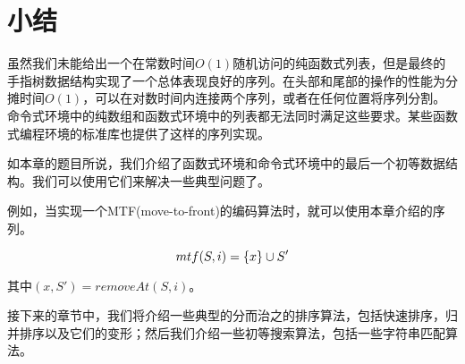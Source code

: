 \documentclass[UTF8]{article}
\begin{document}
\section{小结}

虽然我们未能给出一个在常数时间$O(1)$随机访问的纯函数式列表，但是最终的手指树数据结构实现了一个总体表现良好的序列。在头部和尾部的操作的性能为分摊时间$O(1)$，可以在对数时间内连接两个序列，或者在任何位置将序列分割。命令式环境中的纯数组和函数式环境中的列表都无法同时满足这些要求。某些函数式编程环境的标准库也提供了这样的序列实现\cite{hackage-ftr}。

如本章的题目所说，我们介绍了函数式环境和命令式环境中的最后一个初等数据结构。我们可以使用它们来解决一些典型问题了。

例如，当实现一个MTF(move-to-front)的编码算法时\cite{mtf-wiki}，就可以使用本章介绍的序列。

\[
mtf(S, i) = \{x\} \cup S' \\
\]

其中$(x, S') = removeAt(S, i)$。

接下来的章节中，我们将介绍一些典型的分而治之的排序算法，包括快速排序，归并排序以及它们的变形；然后我们介绍一些初等搜索算法，包括一些字符串匹配算法。


\ifx\wholebook\relax \else
\end{document}
